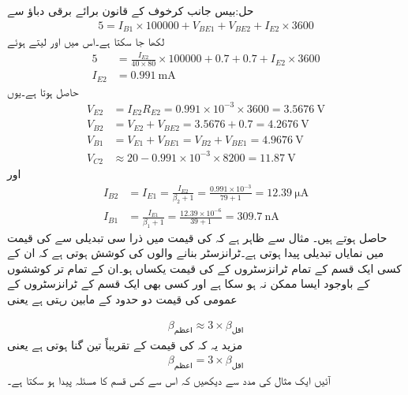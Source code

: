 حل:بیس جانب کرخوف کے قانون برائے برقی دباؤ سے
\begin{align*}
5=I_{B1} \times 100000+V_{BE1}+V_{BE2}+I_{E2} \times 3600
\end{align*}
لکھا جا سکتا ہے۔اس میں  اور  لیتے ہوئے
\begin{align*}
5&=\frac{I_{E2}}{40 \times 80} \times 100000+0.7+0.7+I_{E2} \times 3600\\
I_{E2}&=\SI{0.991}{\milli \ampere}
\end{align*}
حاصل ہوتا ہے۔یوں
\begin{align*}
V_{E2}&=I_{E2} R_{E2}=0.991 \times 10^{-3} \times 3600=\SI{3.5676}{\volt}\\
V_{B2}&=V_{E2}+V_{BE2}=3.5676+0.7=\SI{4.2676}{\volt}\\
V_{B1}&=V_{E1}+V_{BE1}=V_{B2}+V_{BE1}=\SI{4.9676}{\volt}\\
V_{C2}& \approx 20-0.991 \times 10^{-3} \times  8200=\SI{11.87}{\volt}
\end{align*}
اور
\begin{align*}
I_{B2}&=I_{E1}=\frac{I_{E2}}{\beta_2+1}=\frac{0.991 \times 10^{-3}}{79+1}=\SI{12.39}{\micro \ampere}\\
I_{B1}&=\frac{I_{E1}}{\beta_1+1}=\frac{12.39 \times 10^{-6}}{39+1}=\SI{309.7}{\nano \ampere}
\end{align*}
حاصل ہوتے ہیں۔
 \label{حصہ_تبدیلی_بٹا_سے_نکتہ_کارکردگی_کا_سرک_جانا}
مثال  سے ظاہر ہے کہ  کی قیمت میں ذرا سی تبدیلی سے  کی قیمت میں نمایاں تبدیلی پیدا ہوتی ہے۔ٹرانزسٹر بنانے والوں کی کوشش ہوتی ہے کہ ان کے کسی  ایک قسم کے تمام ٹرانزسٹروں کے  کی قیمت یکساں ہو۔ان کے تمام تر کوششوں کے باوجود ایسا ممکن نہ ہو سکا ہے اور کسی بھی ایک قسم کے ٹرانزسٹروں کے عمومی    کی قیمت دو حدود کے مابین رہتی ہے یعنی

\begin{align}
\beta_{\text{اعظم}} \approx  3 \times \beta_{\text{اقل}}
\end{align}
مزید یہ کہ  کی قیمت  کے تقریباً تین گنا ہوتی ہے یعنی
\begin{align}
\beta_{\text{اعظم}} =   { 3 \times \beta_{\text{اقل}}}
\end{align}
آئیں ایک مثال کی مدد سے دیکھیں کہ اس سے کس قسم کا مسئلہ پیدا ہو سکتا ہے۔

